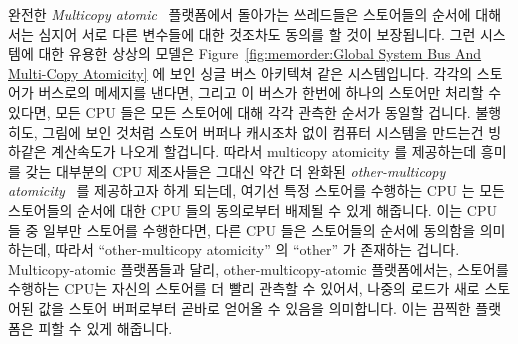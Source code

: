 완전한 \emph{Multicopy atomic}~\cite{Stone:1995:SP:623262.623912} 플랫폼에서
돌아가는 쓰레드들은 스토어들의 순서에 대해서는 심지어 서로 다른 변수들에 대한
것조차도 동의를 할 것이 보장됩니다.
그런 시스템에 대한 유용한 상상의 모델은
Figure~\ref{fig:memorder:Global System Bus And Multi-Copy Atomicity}
에 보인 싱글 버스 아키텍쳐 같은 시스템입니다.
각각의 스토어가 버스로의 메세지를 낸다면, 그리고 이 버스가 한번에 하나의
스토어만 처리할 수 있다면, 모든 CPU 들은 모든 스토어에 대해 각각 관측한 순서가
동일할 겁니다.
불행히도, 그림에 보인 것처럼 스토어 버퍼나 캐시조차 없이 컴퓨터 시스템을
만드는건 빙하같은 계산속도가 나오게 할겁니다.
따라서 multicopy atomicity 를 제공하는데 흥미를 갖는 대부분의 CPU 제조사들은
그대신 약간 더 완화된
\emph{other-multicopy atomicity}~\cite[Section B2.3]{ARMv8A:2017} 를 제공하고자
하게 되는데, 여기선 특정 스토어를 수행하는 CPU 는 모든 스토어들의 순서에 대한
CPU 들의 동의로부터 배제될 수 있게 해줍니다.
이는 CPU 들 중 일부만 스토어를 수행한다면, 다른 CPU 들은 스토어들의 순서에
동의함을 의미하는데, 따라서 ``other-multicopy atomicity'' 의 ``other'' 가
존재하는 겁니다.
Multicopy-atomic 플랫폼들과 달리, other-multicopy-atomic 플랫폼에서는, 스토어를
수행하는 CPU는 자신의 스토어를 더 빨리 관측할 수 있어서, 나중의 로드가 새로
스토어된 값을 스토어 버퍼로부터 곧바로 얻어올 수 있음을 의미합니다.
이는 끔찍한 플랫폼은 피할 수 있게 해줍니다.

